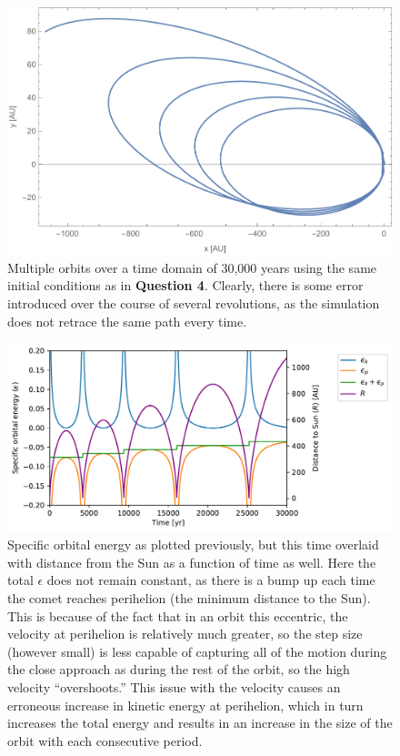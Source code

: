 \documentclass{article}
\begin{document}
\begin{figure}[h!]
    \centering
    \includegraphics[width=5in]{homework3/q5orbit.pdf}
    \caption{Multiple orbits over a time domain of 30,000 years using the same initial conditions as in \textbf{Question 4}. Clearly, there is some error introduced over the course of several revolutions, as the simulation does not retrace the same path every time.}
    \label{fig:q5orbit}
\end{figure}

\begin{figure}[h!]
    \centering
    \includegraphics[width=5.5in]{homework3/q5energy.pdf}
    \caption{Specific orbital energy as plotted previously, but this time overlaid with distance from the Sun as a function of time as well. Here the total $\epsilon$ does not remain constant, as there is a bump up each time the comet reaches perihelion (the minimum distance to the Sun). This is because of the fact that in an orbit this eccentric, the velocity at perihelion is relatively much greater, so the step size (however small) is less capable of capturing all of the motion during the close approach as during the rest of the orbit, so the high velocity ``overshoots.'' This issue with the velocity causes an erroneous increase in kinetic energy at perihelion, which in turn increases the total energy and results in an increase in the size of the orbit with each consecutive period.}
    \label{fig:q5energy}
\end{figure}
\end{document}
